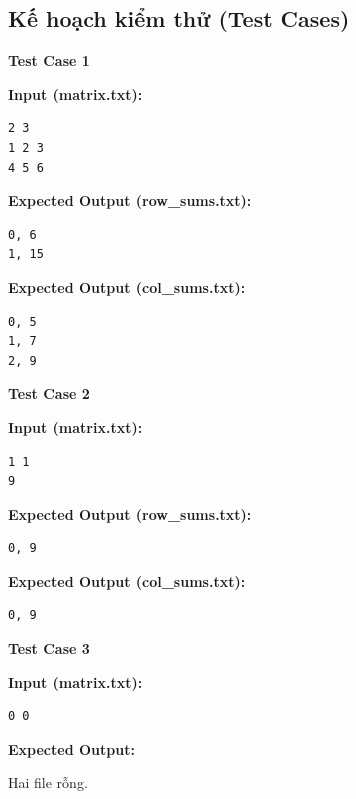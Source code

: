 \subsection{Kế hoạch kiểm thử (Test Cases)}

\textbf{Test Case 1}

\textbf{Input (matrix.txt):}
\begin{lstlisting}
2 3
1 2 3
4 5 6
\end{lstlisting}

\textbf{Expected Output (row\_sums.txt):}
\begin{lstlisting}
0, 6
1, 15
\end{lstlisting}

\textbf{Expected Output (col\_sums.txt):}
\begin{lstlisting}
0, 5
1, 7
2, 9
\end{lstlisting}

\textbf{Test Case 2}

\textbf{Input (matrix.txt):}
\begin{lstlisting}
1 1
9
\end{lstlisting}

\textbf{Expected Output (row\_sums.txt):}
\begin{lstlisting}
0, 9
\end{lstlisting}

\textbf{Expected Output (col\_sums.txt):}
\begin{lstlisting}
0, 9
\end{lstlisting}

\textbf{Test Case 3}

\textbf{Input (matrix.txt):}
\begin{lstlisting}
0 0
\end{lstlisting}

\textbf{Expected Output:}

Hai file rỗng.